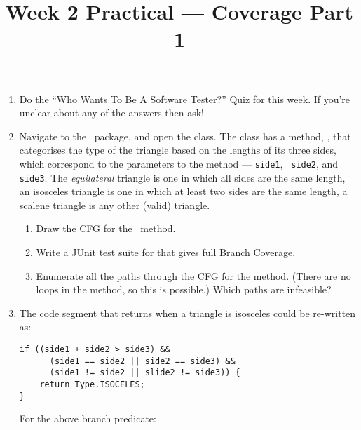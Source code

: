 



\title{Week 2 Practical --- Coverage Part 1}

\begin{enumerate}

    \item Do the ``Who Wants To Be A Software Tester?'' Quiz for this week.
    If you're unclear about any of the answers then ask!

    \item Navigate to the \examplespackage~package, and open the
    \triangleclass class. The class has a method, \classifymethod, that
    categorises the type of the triangle based on the lengths of its three sides,
    which correspond to the parameters to the method --- {\tt side1}, {\tt
    side2}, and {\tt side3}. The {\it equilateral} triangle is one in which all sides
    are the same length, an isosceles triangle is one in which at least two
    sides are the same length, a scalene triangle is any other (valid) triangle. 

        \begin{enumerate}

            \item Draw the CFG for the \classifymethod~method.
            
            \item Write a JUnit test suite for \triangleclass that gives 
            full Branch Coverage. 
            
            \item Enumerate all the paths through the CFG for the method. (There
            are no loops in the method, so this is possible.) Which paths are
            infeasible?
            
        \end{enumerate}

    \item The code segment that returns when a triangle is isosceles could be re-written as:

        \verb$if ((side1 + side2 > side3) &&$\\ 
        \verb$      (side1 == side2 || side2 == side3) &&$\\
        \verb$      (side1 != side2 || slide2 != side3)) {$\\
        \verb$    return Type.ISOCELES;$\\
        \verb$}$

        For the above branch predicate:


\end{enumerate}
